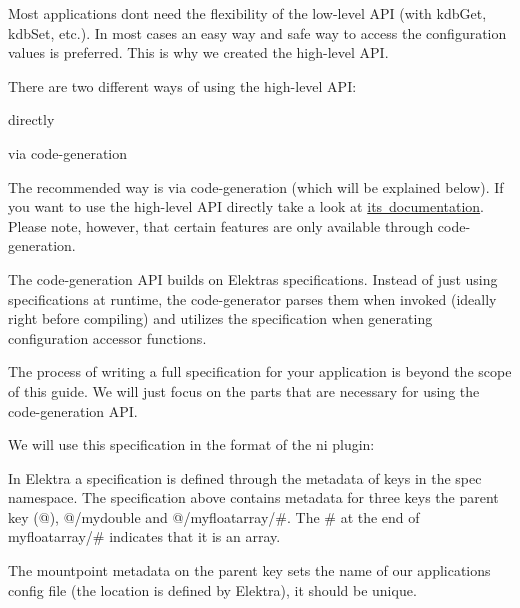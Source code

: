 Most applications don\textquotesingle{}t need the flexibility of the low-\/level A\+PI (with {\ttfamily kdb\+Get}, {\ttfamily kdb\+Set}, etc.). In most cases an easy way and safe way to access the configuration values is preferred. This is why we created the high-\/level A\+PI.

There are two different ways of using the high-\/level A\+PI\+:


\begin{DoxyEnumerate}
\item directly
\item via code-\/generation
\end{DoxyEnumerate}

The recommended way is via code-\/generation (which will be explained below). If you want to use the high-\/level A\+PI directly take a look at \mbox{\hyperlink{src_libs_highlevel_README_md}{its documentation}}. Please note, however, that certain features are only available through code-\/generation.

The code-\/generation A\+PI builds on Elektra\textquotesingle{}s specifications. Instead of just using specifications at runtime, the code-\/generator parses them when invoked (ideally right before compiling) and utilizes the specification when generating configuration accessor functions.

The process of writing a full specification for your application is beyond the scope of this guide. We will just focus on the parts that are necessary for using the code-\/generation A\+PI.

We will use this specification in the format of the {\ttfamily ni} plugin\+:


\begin{DoxyCode}{0}
\DoxyCodeLine{[]}
\DoxyCodeLine{}
\DoxyCodeLine{[mydouble]}
\DoxyCodeLine{}
\DoxyCodeLine{[myfloatarray/\#]}
\end{DoxyCode}


In Elektra a specification is defined through the metadata of keys in the {\ttfamily spec} namespace. The specification above contains metadata for three keys the parent key ({\ttfamily @}), {\ttfamily @/mydouble} and {\ttfamily @/myfloatarray/\#}. The {\ttfamily \#} at the end of {\ttfamily myfloatarray/\#} indicates that it is an array.

The {\ttfamily mountpoint} metadata on the parent key sets the name of our application\textquotesingle{}s config file (the location is defined by Elektra), it should be unique.

